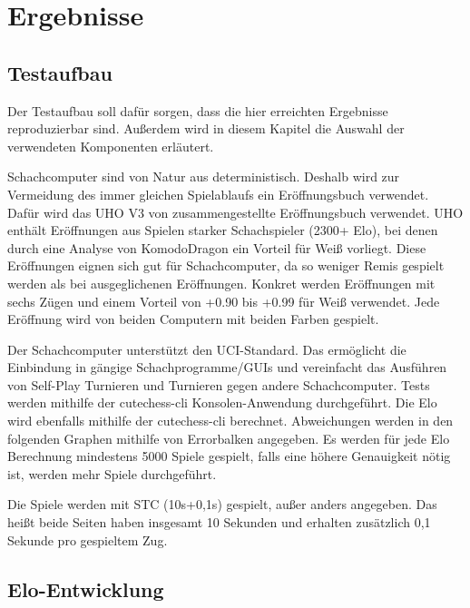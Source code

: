 \chapter{Ergebnisse}
\label{chap:Ergebnisse}

\section{Testaufbau}

Der Testaufbau soll dafür sorgen, dass die hier erreichten Ergebnisse reproduzierbar sind. Außerdem wird in diesem Kapitel die Auswahl der verwendeten Komponenten erläutert.

Schachcomputer sind von Natur aus deterministisch. Deshalb wird zur Vermeidung des immer gleichen Spielablaufs ein Eröffnungsbuch verwendet. Dafür wird das \ac{UHO} V3 von \citeauthor{Pohl2021} \cite{Pohl2021} zusammengestellte Eröffnungsbuch verwendet. \ac{UHO} enthält Eröffnungen aus Spielen starker Schachspieler (2300+ Elo), bei denen durch eine Analyse von KomodoDragon \cite{KomodoDragon} ein Vorteil für Weiß vorliegt. Diese Eröffnungen eignen sich gut für Schachcomputer, da so weniger Remis gespielt werden als bei ausgeglichenen Eröffnungen. Konkret werden Eröffnungen mit sechs Zügen und einem Vorteil von +0.90 bis +0.99 für Weiß verwendet. Jede Eröffnung wird von beiden Computern mit beiden Farben gespielt.

Der Schachcomputer unterstützt den \ac{UCI}-Standard. Das ermöglicht die Einbindung in gängige Schachprogramme/GUIs und vereinfacht das Ausführen von Self-Play Turnieren und Turnieren gegen andere Schachcomputer. Tests werden mithilfe der cutechess-cli \cite{CutechessRepo} Konsolen-Anwendung durchgeführt. Die Elo wird ebenfalls mithilfe der cutechess-cli berechnet. Abweichungen werden in den folgenden Graphen mithilfe von Errorbalken angegeben. Es werden für jede Elo Berechnung mindestens 5000 Spiele gespielt, falls eine höhere Genauigkeit nötig ist, werden mehr Spiele durchgeführt.

Die Spiele werden mit \ac{STC} (10s+0,1s) gespielt, außer anders angegeben. Das heißt beide Seiten haben insgesamt 10 Sekunden und erhalten zusätzlich 0,1 Sekunde pro gespieltem Zug.

\section{Elo-Entwicklung}

